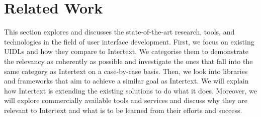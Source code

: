 
\chapter{Related Work} \label{relatedWork}

This section explores and discusses the state-of-the-art research, tools, and technologies in the field of user interface development. First, we focus on existing UIDLs and how they compare to Intertext. We categorise them to demonstrate the relevancy as coherently as possible and investigate the ones that fall into the same category as Intertext on a case-by-case basis. Then, we look into libraries and frameworks that aim to achieve a similar goal as Intertext. We will explain how Intertext is extending the existing solutions to do what it does. Moreover, we will explore commercially available tools and services and discuss why they are relevant to Intertext and what is to be learned from their efforts and success.




